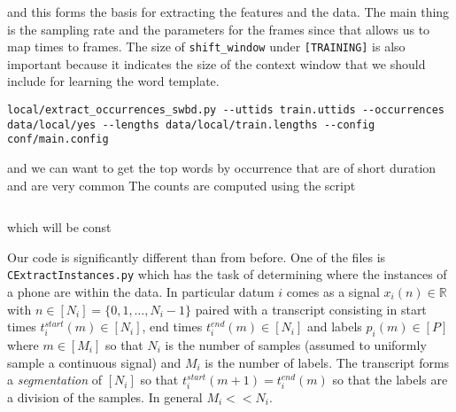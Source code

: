 \documentclass{article}
\begin{document}
and this forms the basis for extracting the features
and the data.
The main thing is the sampling rate and the parameters for the
frames since that allows us to map times to frames.  The size of
\texttt{shift\_window} under \texttt{[TRAINING]} is also important
because it indicates the size of the context window that we
should include for learning the word template.
\begin{verbatim}
local/extract_occurrences_swbd.py --uttids train.uttids --occurrences data/local/yes --lengths data/local/train.lengths --config conf/main.config
\end{verbatim}


and we can 
want to get the top words by occurrence that are
of short duration and are very common
 The counts are computed
using the script
\begin{verbatim}

\end{verbatim}
which will be const


Our code is significantly different than from before.  One of the files is \texttt{CExtractInstances.py}
which has the task of determining where the instances of a phone are within the data. In particular datum $i$ comes as 
a signal $x_i(n)\in\mathbb{R}$ with $n\in[N_i]=\{0,1,\ldots,N_i-1\}$ paired with a transcript consisting in start times $t_i^{start}(m)\in[N_i]$,
end times $t_i^{end}(m)\in[N_i]$ and labels $p_i(m)\in [P]$ where $m\in[M_i]$ so that $N_i$ is the number of samples (assumed to 
uniformly sample a continuous signal) and $M_i$ is the number of labels.  The transcript forms a \textit{segmentation} of
$[N_i]$ so that $t_i^{start}(m+1)=t_i^{end}(m)$ so that the labels are a division of the samples.  In general $M_i << N_i$.
\end{document}
